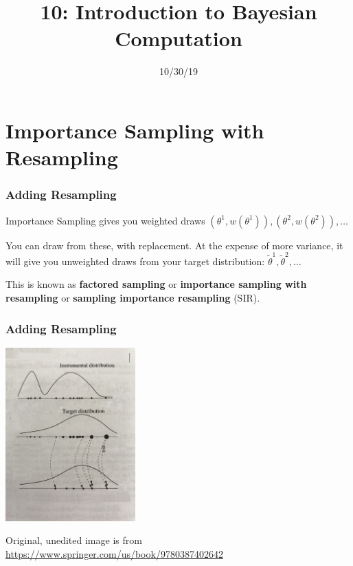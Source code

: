 \documentclass{beamer}
\title["10"]{10: Introduction to Bayesian Computation}
\date{10/30/19}
\begin{document}

\begin{frame}
\titlepage 
\end{frame}



\begin{frame}
\tableofcontents
\end{frame}


\section{Importance Sampling with Resampling}
\begin{frame}[fragile]
\frametitle{Adding Resampling}

Importance Sampling gives you weighted draws $(\theta^1, w(\theta^1) ), (\theta^2, w(\theta^2) ), \ldots$
\newline

You can draw from these, with replacement. At the expense of more variance, it will give you unweighted draws from your target distribution:
$\tilde{\theta}^1, \tilde{\theta}^2, \ldots $
\newline

This is known as {\bf factored sampling} or {\bf importance sampling with resampling} or {\bf sampling importance resampling} (SIR).


\end{frame}

\begin{frame}[fragile]
\frametitle{Adding Resampling}

\begin{center}
\includegraphics[width=50mm]{isr.jpg}
\end{center}
Original, unedited image is from \url{https://www.springer.com/us/book/9780387402642}

\end{frame}
\end{document}
